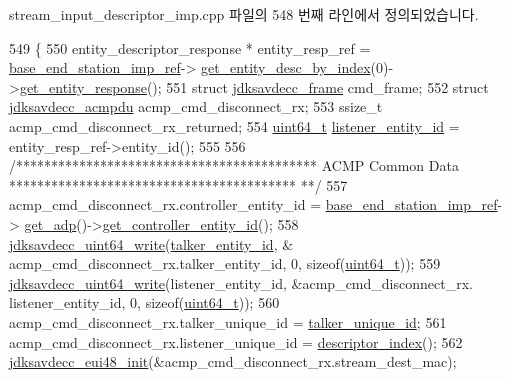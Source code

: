 stream\+\_\+input\+\_\+descriptor\+\_\+imp.\+cpp 파일의 548 번째 라인에서 정의되었습니다.


\begin{DoxyCode}
549 \{
550     entity\_descriptor\_response * entity\_resp\_ref = \hyperlink{classavdecc__lib_1_1descriptor__base__imp_a550c969411f5f3b69f55cc139763d224}{base\_end\_station\_imp\_ref}->
      \hyperlink{classavdecc__lib_1_1end__station__imp_a2039add3a7eb753152149e07a86ad008}{get\_entity\_desc\_by\_index}(0)->\hyperlink{classavdecc__lib_1_1entity__descriptor_ac31dd117f0c931ae93c8ba52df7211bd}{get\_entity\_response}();
551     \textcolor{keyword}{struct }\hyperlink{structjdksavdecc__frame}{jdksavdecc\_frame} cmd\_frame;
552     \textcolor{keyword}{struct }\hyperlink{structjdksavdecc__acmpdu}{jdksavdecc\_acmpdu} acmp\_cmd\_disconnect\_rx;
553     ssize\_t acmp\_cmd\_disconnect\_rx\_returned;
554     \hyperlink{parse_8c_aec6fcb673ff035718c238c8c9d544c47}{uint64\_t} \hyperlink{structjdksavdecc__acmpdu_ae204d36de673d5135ef97cc19a344b37}{listener\_entity\_id} = entity\_resp\_ref->entity\_id();
555 
556     \textcolor{comment}{/******************************************* ACMP Common Data *****************************************
      **/}
557     acmp\_cmd\_disconnect\_rx.controller\_entity\_id = \hyperlink{classavdecc__lib_1_1descriptor__base__imp_a550c969411f5f3b69f55cc139763d224}{base\_end\_station\_imp\_ref}->
      \hyperlink{classavdecc__lib_1_1end__station__imp_a471a74540ce6182fad0c17dfd010107e}{get\_adp}()->\hyperlink{classavdecc__lib_1_1adp_a0c0959a46658c0a22e9530334b2912da}{get\_controller\_entity\_id}();
558     \hyperlink{group__endian_gaa294fd85c2d887032dad294c6833c903}{jdksavdecc\_uint64\_write}(\hyperlink{structjdksavdecc__acmpdu_a5a263561481c86cc310ff078f7313b6d}{talker\_entity\_id}, &
      acmp\_cmd\_disconnect\_rx.talker\_entity\_id, 0, \textcolor{keyword}{sizeof}(\hyperlink{parse_8c_aec6fcb673ff035718c238c8c9d544c47}{uint64\_t}));
559     \hyperlink{group__endian_gaa294fd85c2d887032dad294c6833c903}{jdksavdecc\_uint64\_write}(listener\_entity\_id, &acmp\_cmd\_disconnect\_rx.
      listener\_entity\_id, 0, \textcolor{keyword}{sizeof}(\hyperlink{parse_8c_aec6fcb673ff035718c238c8c9d544c47}{uint64\_t}));
560     acmp\_cmd\_disconnect\_rx.talker\_unique\_id = \hyperlink{structjdksavdecc__acmpdu_a0358bf4a1f59922974d1f0cb08fd8ef4}{talker\_unique\_id};
561     acmp\_cmd\_disconnect\_rx.listener\_unique\_id = \hyperlink{classavdecc__lib_1_1descriptor__base__imp_ac23c0a35276c07cfce8c8660700c2135}{descriptor\_index}();
562     \hyperlink{group__eui48_gae0bd9d7b819e8314b425d7c8bbae2333}{jdksavdecc\_eui48\_init}(&acmp\_cmd\_disconnect\_rx.stream\_dest\_mac);

\end{DoxyCode}
